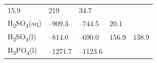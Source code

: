 \documentclass[
  9pt,
]{extbook}
\theoremstyle{definition}
\theoremstyle{definition}
\theoremstyle{definition}
\theoremstyle{remark}
\begin{document}
\begin{longtable}[]{@{}lllll@{}}
\begin{minipage}[t]{0.20\columnwidth}
15.9\strut
\end{minipage} & \begin{minipage}[t]{0.18\columnwidth}\raggedright
219\strut
\end{minipage} & \begin{minipage}[t]{0.18\columnwidth}\raggedright
34.7\strut
\end{minipage}\tabularnewline
\begin{minipage}[t]{0.10\columnwidth}\raggedright
H\textsubscript{2}SO\textsubscript{4}(aq)\strut
\end{minipage} & \begin{minipage}[t]{0.19\columnwidth}\raggedright
--909.3\strut
\end{minipage} & \begin{minipage}[t]{0.20\columnwidth}\raggedright
--744.5\strut
\end{minipage} & \begin{minipage}[t]{0.18\columnwidth}\raggedright
20.1\strut
\end{minipage} & \begin{minipage}[t]{0.18\columnwidth}\raggedright
\strut
\end{minipage}\tabularnewline
\begin{minipage}[t]{0.10\columnwidth}\raggedright
H\textsubscript{2}SO\textsubscript{4}(l)\strut
\end{minipage} & \begin{minipage}[t]{0.19\columnwidth}\raggedright
--814.0\strut
\end{minipage} & \begin{minipage}[t]{0.20\columnwidth}\raggedright
--690.0\strut
\end{minipage} & \begin{minipage}[t]{0.18\columnwidth}\raggedright
156.9\strut
\end{minipage} & \begin{minipage}[t]{0.18\columnwidth}\raggedright
138.9\strut
\end{minipage}\tabularnewline
\begin{minipage}[t]{0.10\columnwidth}\raggedright
H\textsubscript{3}PO\textsubscript{4}(l)\strut
\end{minipage} & \begin{minipage}[t]{0.19\columnwidth}\raggedright
--1271.7\strut
\end{minipage} & \begin{minipage}[t]{0.20\columnwidth}\raggedright
--1123.6\strut
\end{minipage} & \begin{minipage}[t]{0.18\columnwidth}\raggedright

\end{minipage}
\end{longtable}
\end{document}
